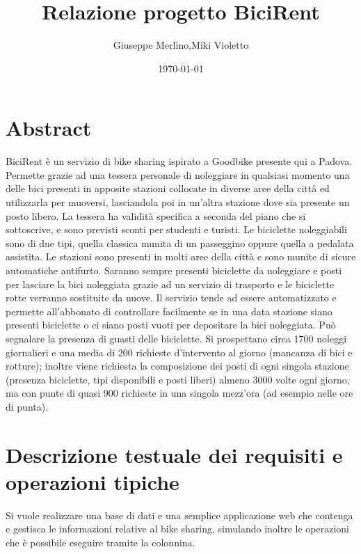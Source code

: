 \documentclass[a4paper,twoside]{article}
\author{Giuseppe Merlino,Miki Violetto}
\title{Relazione progetto BiciRent}
\date{\today}
\begin{document}
\maketitle

\newpage
\tableofcontents
\newpage
\listoffigures
\newpage


\section{Abstract}
BiciRent è un servizio di bike sharing ispirato a Goodbike presente qui a Padova.\newline
Permette grazie ad una tessera personale di noleggiare in qualsiasi momento una delle bici presenti in apposite stazioni collocate in diverse aree della città ed utilizzarla per muoversi, lasciandola poi in un'altra stazione dove sia presente un posto libero.\newline
La tessera ha validità specifica a seconda del piano che si sottoscrive, e sono previsti sconti per studenti e turisti.\newline
Le biciclette noleggiabili sono di due tipi, quella classica munita di un passeggino oppure quella a pedalata assistita.\newline
Le stazioni sono presenti in molti aree della città e sono munite di sicure automatiche antifurto. Saranno sempre presenti biciclette da noleggiare e posti per lasciare la bici noleggiata grazie ad un servizio di trasporto e le biciclette rotte verranno sostituite da nuove.\newline
Il servizio tende ad essere automatizzato e permette all'abbonato di controllare facilmente se in una data stazione siano presenti biciclette o ci siano posti vuoti per depositare la bici noleggiata. Può segnalare la presenza di guasti delle biciclette.\newline
Si prospettano circa 1700 noleggi giornalieri e una media di 200 richieste d'intervento al giorno (mancanza di bici e rotture); inoltre viene richiesta la composizione dei posti di ogni singola stazione (presenza biciclette, tipi disponibili e posti liberi) almeno 3000 volte ogni giorno, ma con punte di quasi 900 richieste in una singola mezz'ora (ad esempio nelle ore di punta).

\section{Descrizione testuale dei requisiti e operazioni tipiche}
Si vuole realizzare una base di dati e una semplice applicazione web che contenga e gestisca le informazioni relative al bike sharing, simulando inoltre le operazioni che è possibile eseguire tramite la colonnina.
\end{document}
